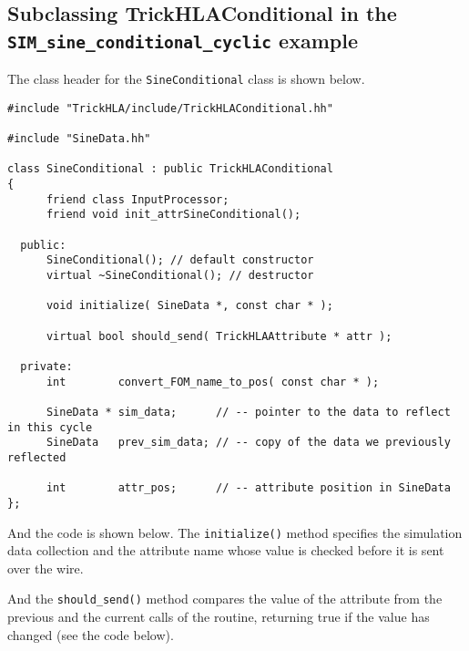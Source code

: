 \subsection{Subclassing TrickHLAConditional in the {\tt SIM\_sine\_conditional\_cyclic} example}

The class header for the {\tt SineConditional} class is shown below.

\begin{lstlisting}[caption={{\tt SineConditional} header file},label={list:sine-conditional-header}]
#include "TrickHLA/include/TrickHLAConditional.hh"

#include "SineData.hh"

class SineConditional : public TrickHLAConditional
{
      friend class InputProcessor;
      friend void init_attrSineConditional();

  public:
      SineConditional(); // default constructor
      virtual ~SineConditional(); // destructor

      void initialize( SineData *, const char * );

      virtual bool should_send( TrickHLAAttribute * attr );

  private:
      int        convert_FOM_name_to_pos( const char * );

      SineData * sim_data;      // -- pointer to the data to reflect in this cycle
      SineData   prev_sim_data; // -- copy of the data we previously reflected

      int        attr_pos;      // -- attribute position in SineData
};
\end{lstlisting}

And the code is shown below.
The {\tt initialize()} method specifies the simulation data collection and the
attribute name whose value is checked before it is sent over the wire.

And the {\tt should\_send()} method compares the value of the attribute from the
previous and the current calls of the routine, returning true if the value has
changed (see the code below).

